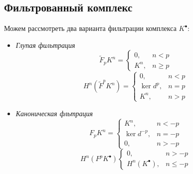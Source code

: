 \documentclass[../main.tex]{subfiles}
\begin{document}
\subsection{Фильтрованный комплекс}
Можем рассмотреть два варианта фильтрации комплекса $K^\bullet$:
\begin{itemize}
\item \textit{Глупая фильтрация}
\[
\widetilde{F}_p K^n = \begin{cases} 0, &n < p \\ K^n, & n \ge p \end{cases}
\]
\[
H^n(\widetilde{F}^p K^n) = \begin{cases} 0, &n < p\\ \ker d^p, & n=p \\ K^n, & n > p \end{cases}
\]
\bee
{}
\eee
\item \textit{Каноническая фльтрация}
\[
F_p K^n = \begin{cases} K^n, &n < -p \\ \ker d^{-p}, & n = -p \\ 0, & n>-p \end{cases}
\]
\[
H^n (F^p K^\bullet) \begin{cases} 0, &n > -p \\ H^n(K^\bullet), & n\le-p \end{cases}
\]
\bee
{}
\eee
\end{itemize}
\end{document}
